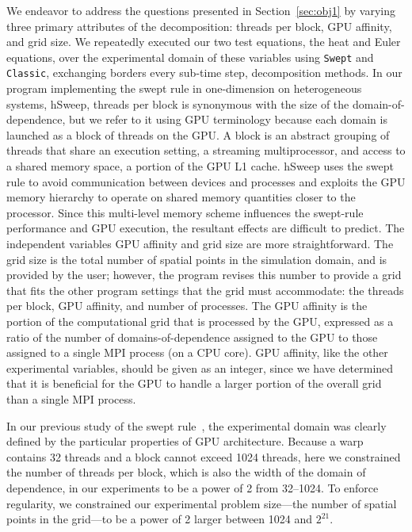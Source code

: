 We endeavor to address the questions presented in Section~\ref{sec:obj1} by varying
three primary attributes of the decomposition: threads per block, GPU affinity, and grid size.
We repeatedly executed our two test equations, the heat and Euler equations, over the
experimental domain of these variables using \texttt{Swept} and \texttt{Classic}, exchanging borders every
sub-time step, decomposition methods.
In our program implementing the swept rule in one-dimension on heterogeneous systems, hSweep,
threads per block is synonymous with the size of the domain-of-dependence, but we refer to it using GPU terminology because each domain is launched as a block of threads on the GPU.
A block is an abstract grouping of threads that share an execution setting, a streaming multiprocessor, and access to a shared memory space, a portion of the GPU L1 cache.
hSweep uses the swept rule to avoid communication between devices and processes and exploits the
GPU memory hierarchy to operate on shared memory quantities closer to the processor.
Since this multi-level memory scheme influences the swept-rule performance and GPU execution, the resultant effects are difficult to predict.
The independent variables GPU affinity and grid size are more straightforward.
The grid size is the total number of spatial points in the simulation domain, and is provided
by the user; however, the program revises this number to provide a grid that fits the other program settings
that the grid must accommodate: the threads per block, GPU affinity, and number of processes.
The GPU affinity is the portion of the computational grid that is processed by the GPU,
expressed as a ratio of the number of domains-of-dependence assigned to the GPU to those assigned to a single MPI process (on a CPU core).
GPU affinity, like the other experimental variables, should be given as an integer, since we have
determined that it is beneficial for the GPU to handle a larger portion of the overall grid
than a single MPI process.

In our previous study of the swept rule~\cite{OurJCP}, the experimental domain was clearly
defined by the particular properties of GPU architecture.
Because a warp contains 32 threads and a block cannot exceed 1024 threads, here we constrained
the number of threads per block, which is also the width of the domain of dependence, in our experiments
to be a power of 2 from \numrange{32}{1024}.
To enforce regularity, we constrained our experimental problem size---the number of spatial points in the
grid---to be a power of 2 larger between \num{1024} and $2^{21}$.

